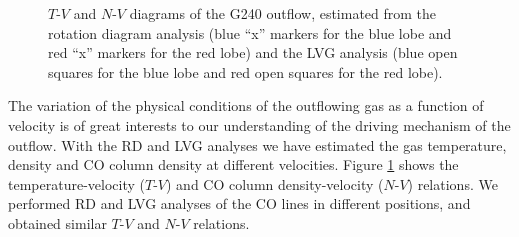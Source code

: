 \begin{figure}[!tbp]
\caption{$T$-$V$ and $N$-$V$ diagrams of the G240 outflow, estimated from the rotation diagram analysis (blue ``x'' markers for the blue lobe and red ``x'' markers for the red lobe) and the LVG analysis (blue open squares for the blue lobe and red open squares for the red lobe). \label{fig:figrelation}}
\end{figure}

The variation of the physical conditions of the outflowing gas as a function of velocity is of great interests to our understanding of the driving mechanism of the outflow. With the RD and LVG analyses we have estimated the gas temperature, density and CO column density at different velocities. Figure \ref{fig:figrelation} shows the temperature-velocity ($T$-$V$) and CO column density-velocity ($N$-$V$) relations. We performed RD and LVG analyses of the CO lines in different positions, and obtained similar $T$-$V$ and $N$-$V$ relations.




